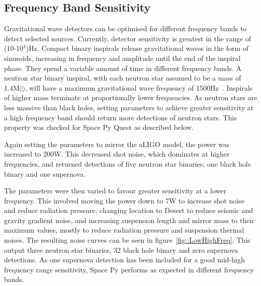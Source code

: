 \documentclass{article}
\begin{document}
\subsection{Frequency Band Sensitivity}
\label{sec::fband}
Gravitational wave detectors can be optimised for different frequency
bands to detect selected sources. Currently, detector sensitivity is
greatest in the range of (10-10$^3$)Hz. Compact binary inspirals
release gravitational waves in the form of sinusoids, increasing in
frequency and amplitude until the end of the inspiral phase. They
spend a variable amount of time in different frequency bands. A
neutron star binary inspiral, with each neutron star assumed to be a
mass of 1.4M$\odot$, will have a maximum gravitational wave frequency
of 1500Hz~\cite{LIGO}. Inspirals of higher mass terminate at
proportionally lower frequencies. As neutron stars are less massive
than black holes, setting parameters to achieve greater sensitivity at
a high frequency band should return more detections of neutron
stars. This property was checked for Space Py Quest as described
below. 

Again setting the parameters to mirror the aLIGO model, the power was
increased to 200W. This decreased shot noise, which dominates at
higher frequencies, and returned detections of five neutron star
binaries, one black hole binary and one supernova. 

The parameters were then varied to favour greater sensitivity at a
lower frequency. This involved moving the power down to 7W to increase
shot noise and reduce radiation pressure, changing location to Desert
to reduce seismic and gravity gradient noise, and increasing
suspension length and mirror mass to their maximum values, mostly to
reduce radiation pressure and suspension thermal noises. The resulting
noise curves can be seen in figure~\ref{fig::LowHighFreq}. This output
three neutron star binaries, 32 black hole binary and zero supernova
detections. As one supernova detection has been included for a good
mid-high frequency range sensitivity, Space Py performs as expected in
different frequency bands. 
\end{document}
